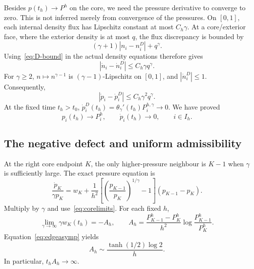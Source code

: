 \documentclass[11pt,a4paper]{article}
\theoremstyle{remark}
\begin{document}
Besides $p(t_h)\to P^h$ on the core, we need the pressure derivative to converge to zero. This is not inferred merely from convergence of the pressures. On $[0,1]$, each internal density flux has Lipschitz constant at most $C_h\gamma$. At a core/exterior face, where the exterior density is at most $q$, the flux discrepancy is bounded by
\[
 (\gamma+1)|n_i-n_i^D|+q^\gamma.
\]
Using~\eqref{eq:D-bound} in the actual density equations therefore gives
\[
 |\dot n_i-\dot n_i^D|\le C_h\gamma q^\gamma.
\]
For $\gamma\ge2$, $n\mapsto n^{\gamma-1}$ is $(\gamma-1)$-Lipschitz on $[0,1]$, and $|\dot n_i^D|\le1$. Consequently,
\begin{equation}\label{eq:derivdiff}
 |\dot p_i-\dot p_i^D|\le C_h\gamma^2q^\gamma.
\end{equation}
At the fixed time $t_h>t_0$, $\dot p_i^D(t_h)=\theta_\gamma'(t_h)P_i^{h,\gamma}\to0$. We have proved
\begin{equation}\label{eq:corelimits}
 p_i(t_h)\longrightarrow P_i^h,\qquad
 \dot p_i(t_h)\longrightarrow0,\qquad i\in I_h.
\end{equation}

\subsection{The negative defect and uniform admissibility}

At the right core endpoint $K$, the only higher-pressure neighbour is $K-1$ when $\gamma$ is sufficiently large. The exact pressure equation is
\begin{equation}\label{eq:pressureidentity}
 \frac{\dot p_K}{\gamma p_K}
 =w_K+\frac1{h^2}
 \left[\left(\frac{p_{K-1}}{p_K}\right)^{1/\gamma}-1\right]
 (p_{K-1}-p_K).
\end{equation}
Multiply by $\gamma$ and use~\eqref{eq:corelimits}. For each fixed $h$,
\begin{equation}\label{eq:scaledlimit}
 \lim_{\gamma\to\infty}\gamma w_K(t_h)=-A_h,\qquad
 A_h=\frac{P_{K-1}^h-P_K^h}{h^2}
 \log\frac{P_{K-1}^h}{P_K^h}.
\end{equation}
Equation~\eqref{eq:edgeasymp} yields
\begin{equation}\label{eq:Aasymp}
 A_h\sim\frac{\tanh(1/2)\log2}{h}.
\end{equation}
In particular, $t_hA_h\to\infty$.
\end{document}
